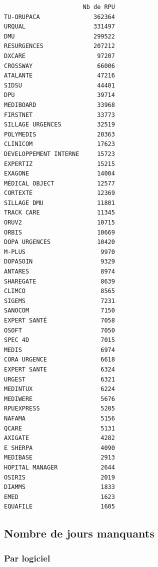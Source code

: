 \documentclass[]{article}
\begin{document}
\begin{verbatim}
                      Nb de RPU
TU-ORUPACA               362364
URQUAL                   331497
DMU                      299522
RESURGENCES              207212
DXCARE                    97207
CROSSWAY                  66006
ATALANTE                  47216
SIDSU                     44401
DPU                       39714
MEDIBOARD                 33968
FIRSTNET                  33773
SILLAGE URGENCES          32519
POLYMEDIS                 20363
CLINICOM                  17623
DEVELOPPEMENT INTERNE     15723
EXPERTIZ                  15215
EXAGONE                   14004
MÉDICAL OBJECT            12577
CORTEXTE                  12369
SILLAGE DMU               11801
TRACK CARE                11345
ORUV2                     10715
ORBIS                     10669
DOPA URGENCES             10420
M-PLUS                     9970
DOPASOIN                   9329
ANTARES                    8974
SHAREGATE                  8639
CLIMCO                     8565
SIGEMS                     7231
SANOCOM                    7150
EXPERT SANTÉ               7058
OSOFT                      7050
SPEC 4D                    7015
MEDIS                      6974
CORA URGENCE               6618
EXPERT SANTE               6324
URGEST                     6321
MEDINTUX                   6224
MEDIWERE                   5676
RPUEXPRESS                 5205
NAFAMA                     5156
QCARE                      5131
AXIGATE                    4282
E SHERPA                   4090
MEDIBASE                   2913
HOPITAL MANAGER            2644
OSIRIS                     2019
DIAMMS                     1833
EMED                       1623
EQUAFILE                   1605
\end{verbatim}

\subsection{Nombre de jours manquants}\label{nombre-de-jours-manquants}

\subsubsection{Par logiciel}\label{par-logiciel}
\end{document}
